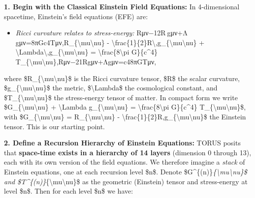 \documentclass[
]{article}
\begin{document}
\textbf{1. Begin with the Classical Einstein Field Equations:} In
4-dimensional spacetime, Einstein's field equations (EFE) are:

\begin{itemize}
\item
  \emph{Ricci curvature relates to stress-energy:}
  Rμν−12R gμν+Λ gμν=8πGc4Tμν,R\_\{\textbackslash mu\textbackslash nu\} -
  \textbackslash frac\{1\}\{2\}R\textbackslash,g\_\{\textbackslash mu\textbackslash nu\}
  +
  \textbackslash Lambda\textbackslash,g\_\{\textbackslash mu\textbackslash nu\}
  = \textbackslash frac\{8\textbackslash pi G\}\{c\^{}4\}
  T\_\{\textbackslash mu\textbackslash nu\},Rμν\hspace{0pt}−21\hspace{0pt}Rgμν\hspace{0pt}+Λgμν\hspace{0pt}=c48πG\hspace{0pt}Tμν\hspace{0pt},
\end{itemize}

where \$R\_\{\textbackslash mu\textbackslash nu\}\$ is the Ricci
curvature tensor, \$R\$ the scalar curvature,
\$g\_\{\textbackslash mu\textbackslash nu\}\$ the metric,
\$\textbackslash Lambda\$ the cosmological constant, and
\$T\_\{\textbackslash mu\textbackslash nu\}\$ the stress-energy tensor
of matter. In compact form we write
\$G\_\{\textbackslash mu\textbackslash nu\} + \textbackslash Lambda
g\_\{\textbackslash mu\textbackslash nu\} =
\textbackslash frac\{8\textbackslash pi G\}\{c\^{}4\}
T\_\{\textbackslash mu\textbackslash nu\}\$, with
\$G\_\{\textbackslash mu\textbackslash nu\} =
R\_\{\textbackslash mu\textbackslash nu\} -
\textbackslash frac\{1\}\{2\}R,g\_\{\textbackslash mu\textbackslash nu\}\$
the Einstein tensor. This is our starting point\hspace{0pt}.

\textbf{2. Define a Recursion Hierarchy of Einstein Equations:} TORUS
posits that \textbf{space-time exists in a hierarchy of 14 layers}
(dimension 0 through 13), each with its own version of the field
equations\hspace{0pt}. We therefore imagine a \emph{stack} of Einstein
equations, one at each recursion level \$n\$. Denote
\$G\^{}\{(n)\}\emph{\{\textbackslash mu\textbackslash nu\}\$ and
\$T\^{}\{(n)\}}\{\textbackslash mu\textbackslash nu\}\$ as the geometric
(Einstein) tensor and stress-energy at level \$n\$. Then for each level
\$n\$ we have:
\end{document}
